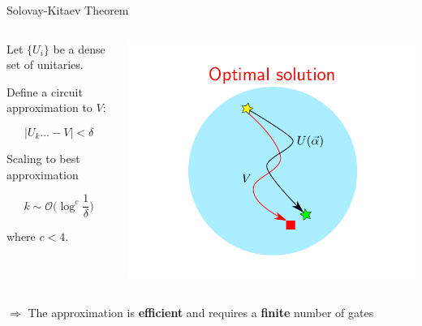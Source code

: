 \documentclass[11p,aspectratio=169]{beamer}
\begin{document}
\begin{frame}{Solovay-Kitaev Theorem}
    \begin{columns}
        \begin{column}{0.5 \textwidth}
            Let $\{U_i \}$ be a dense set of unitaries.

            Define a circuit approximation to $V$:

            $$ |U_k \ldots -V| < \delta $$
            
            Scaling to best approximation

            $$ k \sim \mathcal{O}\Big( \log^c \frac{1}{\delta}\Big)$$

            where $c < 4$.
        \end{column}

        \begin{column}{0.5 \textwidth}

            \includegraphics[width=\textwidth]{figures/optimal.png}
            
        \end{column}
    \end{columns}

    $\Rightarrow$ The approximation is \textbf{efficient} and requires a \textbf{finite} number of gates
    
\end{frame}
\end{document}
